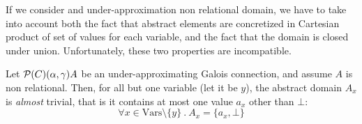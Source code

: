 
If we consider and under-approximation non relational domain, we have to take into account both the fact that abstract elements are concretized in Cartesian product of set of values for each variable, and the fact that the domain is closed under union. Unfortunately, these two properties are incompatible.
\begin{prop}\label{ch3:th:underapprox-non-rel}
	Let $\mathcal{P}(C) (\alpha, \gamma) A$ be an under-approximating Galois connection, and assume $A$ is non relational. Then, for all but one variable (let it be $y$), the abstract domain $A_x$ is \textit{almost} trivial, that is it contains at most one value $a_x$ other than $\bot$:
	\[
	\forall x \in \text{Vars} \setminus \{ y \} \ .\ A_x = \{ a_x, \bot \}
	\]
\end{prop}
\begin{figure}[!ht]
\end{figure}
